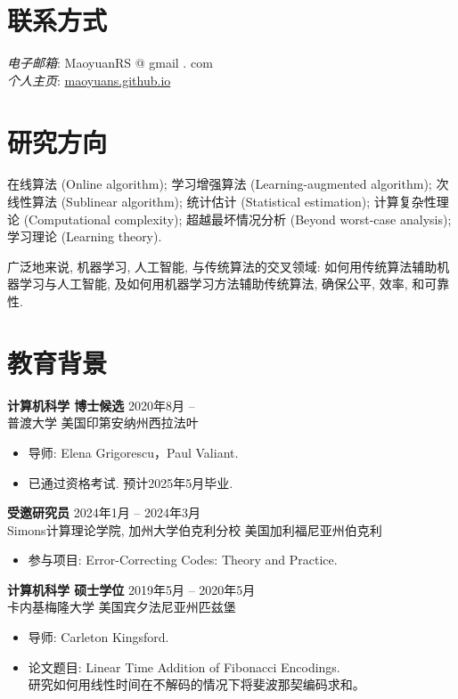 \documentclass[margin, 10pt]{res} %
\begin{document}
\begin{resume}

\section{联系方式}
\emph{电子邮箱}: MaoyuanRS @ gmail . com\\
\emph{个人主页}: \href{https://maoyuans.github.io}{maoyuans.github.io}

 
\section{研究方向}  

在线算法 (Online algorithm); 学习增强算法 (Learning-augmented algorithm); 次线性算法 (Sublinear algorithm); 统计估计 (Statistical estimation); 计算复杂性理论 (Computational complexity); 超越最坏情况分析 (Beyond worst-case analysis); 学习理论 (Learning theory).

广泛地来说, 机器学习, 人工智能, 与传统算法的交叉领域: 如何用传统算法辅助机器学习与人工智能, 及如何用机器学习方法辅助传统算法, 确保公平, 效率, 和可靠性.

\section{教育背景}

{\bf 计算机科学\; 博士候选} \hfill 2020年8月 -- \\
普渡大学 \hfill 美国印第安纳州西拉法叶

\begin{itemize}
\item 导师: Elena Grigorescu，Paul Valiant.
\item 已通过资格考试. 预计2025年5月毕业.
\end{itemize} 

{\bf 受邀研究员} \hfill 2024年1月 -- 2024年3月 \\
Simons计算理论学院, 加州大学伯克利分校 \hfill 美国加利福尼亚州伯克利
\begin{itemize}
\item 参与项目: Error-Correcting Codes: Theory and Practice.
\end{itemize}

{\bf 计算机科学\; 硕士学位} \hfill 2019年5月 -- 2020年5月 \\
卡内基梅隆大学 \hfill 美国宾夕法尼亚州匹兹堡

\begin{itemize}
\item 导师: Carleton Kingsford. \hspace{-2em}
\item 论文题目: Linear Time Addition of Fibonacci Encodings.\\
研究如何用线性时间在不解码的情况下将斐波那契编码求和。
\end{itemize} 


\end{resume}
\end{document}
